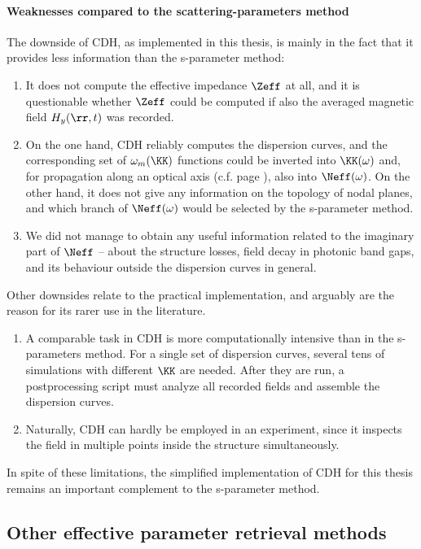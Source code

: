\paragraph{Weaknesses compared to the scattering-parameters method}%
The downside of CDH, as implemented in this thesis, is mainly in the fact that it provides less information than the s-parameter method: 
\begin{enumerate}
\item{It does not compute the effective impedance $\Zeff$ at all, and it is questionable whether $\Zeff$ could be computed if also the averaged magnetic field $H_y(\rr, t)$ was recorded. } 
\item{On the one hand, CDH reliably computes the dispersion curves, and the corresponding set of $\omega_m(\KK)$ functions could be inverted into $\KK(\omega)$ and, for propagation along an optical axis (c.f. page \pageref{indexofrefraction}), also into $\Neff(\omega)$. On the other hand, it does not give any information on the topology of nodal planes, and which branch of $\Neff(\omega)$ would be selected by the s-parameter method. } 
\item{We did not manage to obtain any useful information related to the imaginary part of $\Neff$ -- about the structure losses, field decay in photonic band gaps, and its behaviour outside the dispersion curves in general.}
\end{enumerate}
Other downsides relate to the practical implementation, and arguably are the reason for its rarer use in the literature.
\begin{enumerate}
\item{A comparable task in CDH is more computationally intensive than in the s-parameters method. For a single set of dispersion curves, several tens of simulations with different $\KK$ are needed. After they are run, a postprocessing script must analyze all recorded fields and assemble the dispersion curves. }
\item{Naturally, CDH can hardly be employed in an experiment, since it inspects the field in multiple points inside the structure simultaneously. }
\end{enumerate}
In spite of these limitations, the simplified implementation of CDH for this thesis remains an important complement to the s-parameter method. 

\subsection{Other effective parameter retrieval methods}      %
